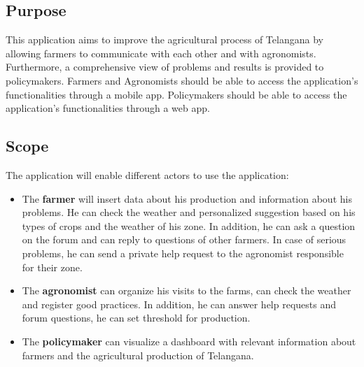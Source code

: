 \subsection{Purpose}
This application aims to improve the agricultural process of Telangana by allowing farmers to communicate with each other and with agronomists.
Furthermore, a comprehensive view of problems and results is provided to policymakers.
Farmers and  Agronomists should be able to access the application's functionalities through a mobile app. Policymakers should be able to access the application's functionalities through a web app.
\subsection{Scope}
The application will enable different actors to use the application:

\begin{itemize}
    \item The \textbf{farmer} will insert data about his production and information about his problems. He can check the weather and personalized suggestion based on his types of crops and the weather of his zone. In addition, he can ask a question on the forum and can reply to questions of other farmers. In case of serious problems, he can send a private help request to the agronomist responsible for their zone.
    \item The \textbf{agronomist} can organize his visits to the farms, can check the weather and register good practices. In addition, he can answer help requests and forum questions, he can set threshold for production.
    \item The \textbf{policymaker} can visualize a dashboard with relevant information about farmers and the agricultural production of Telangana.
\end{itemize}

